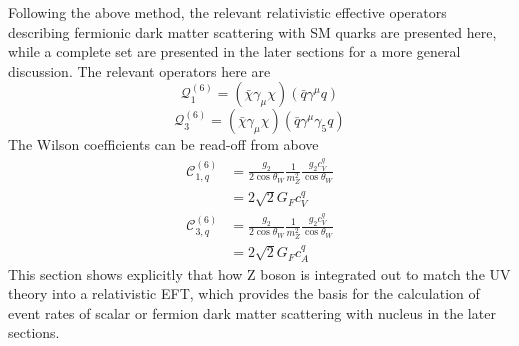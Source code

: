 \documentclass[12pt]{article}
\begin{document}


Following the above method, the relevant relativistic effective operators describing fermionic dark matter scattering with SM quarks are presented here, while a complete set are presented in the later sections for a more general discussion. The relevant operators here are
$$
  \mathcal Q_1^{(6)} = (\bar \chi \gamma_\mu \chi ) (\bar q \gamma^\mu q)
$$
$$
  \mathcal Q_3^{(6)} = (\bar \chi \gamma_\mu \chi ) (\bar q \gamma^\mu \gamma_5 q)
$$
The Wilson coefficients can be read-off from above
\begin{equation}
\begin{aligned}
\mathcal C_{1,q}^{(6)}
&
= \frac{g_2}{2 \cos \theta_W } \frac{1}{m_Z^2} \frac{g_2 c_V^q}{\cos \theta_W}\\
& = 2\sqrt 2 G_F c_V^q
\end{aligned}
\end{equation}
\begin{equation}
\begin{aligned}
\mathcal C_{3,q}^{(6)}
&
= \frac{g_2}{2 \cos \theta_W } \frac{1}{m_Z^2} \frac{g_2 c_V^q}{\cos \theta_W}\\
& = 2\sqrt 2 G_F c_A^q
\end{aligned}
\end{equation}
This section shows explicitly that how Z boson is integrated out to match the UV theory into a relativistic EFT, which provides the basis for the calculation of event rates of scalar or fermion dark matter scattering with nucleus in the later sections. 
\end{document}

